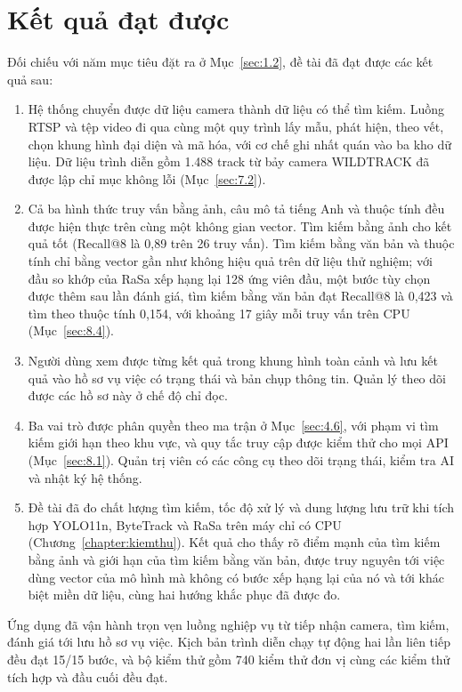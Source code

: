 \section{Kết quả đạt được}
\label{sec:9.1}

Đối chiếu với năm mục tiêu đặt ra ở Mục~\ref{sec:1.2}, đề tài đã đạt được các kết quả sau:
\begin{enumerate}
    \item Hệ thống chuyển được dữ liệu camera thành dữ liệu có thể tìm kiếm. Luồng RTSP và tệp video đi qua cùng một quy trình lấy mẫu, phát hiện, theo vết, chọn khung hình đại diện và mã hóa, với cơ chế ghi nhất quán vào ba kho dữ liệu. Dữ liệu trình diễn gồm 1.488 track từ bảy camera WILDTRACK đã được lập chỉ mục không lỗi (Mục~\ref{sec:7.2}).
    \item Cả ba hình thức truy vấn bằng ảnh, câu mô tả tiếng Anh và thuộc tính đều được hiện thực trên cùng một không gian vector. Tìm kiếm bằng ảnh cho kết quả tốt (Recall@8 là 0,89 trên 26 truy vấn). Tìm kiếm bằng văn bản và thuộc tính chỉ bằng vector gần như không hiệu quả trên dữ liệu thử nghiệm; với đầu so khớp của RaSa xếp hạng lại 128 ứng viên đầu, một bước tùy chọn được thêm sau lần đánh giá, tìm kiếm bằng văn bản đạt Recall@8 là 0,423 và tìm theo thuộc tính 0,154, với khoảng 17 giây mỗi truy vấn trên CPU (Mục~\ref{sec:8.4}).
    \item Người dùng xem được từng kết quả trong khung hình toàn cảnh và lưu kết quả vào hồ sơ vụ việc có trạng thái và bản chụp thông tin. Quản lý theo dõi được các hồ sơ này ở chế độ chỉ đọc.
    \item Ba vai trò được phân quyền theo ma trận ở Mục~\ref{sec:4.6}, với phạm vi tìm kiếm giới hạn theo khu vực, và quy tắc truy cập được kiểm thử cho mọi API (Mục~\ref{sec:8.1}). Quản trị viên có các công cụ theo dõi trạng thái, kiểm tra AI và nhật ký hệ thống.
    \item Đề tài đã đo chất lượng tìm kiếm, tốc độ xử lý và dung lượng lưu trữ khi tích hợp YOLO11n, ByteTrack và RaSa trên máy chỉ có CPU (Chương~\ref{chapter:kiemthu}). Kết quả cho thấy rõ điểm mạnh của tìm kiếm bằng ảnh và giới hạn của tìm kiếm bằng văn bản, được truy nguyên tới việc dùng vector của mô hình mà không có bước xếp hạng lại của nó và tới khác biệt miền dữ liệu, cùng hai hướng khắc phục đã được đo.
\end{enumerate}
Ứng dụng đã vận hành trọn vẹn luồng nghiệp vụ từ tiếp nhận camera, tìm kiếm, đánh giá tới lưu hồ sơ vụ việc. Kịch bản trình diễn chạy tự động hai lần liên tiếp đều đạt 15/15 bước, và bộ kiểm thử gồm 740 kiểm thử đơn vị cùng các kiểm thử tích hợp và đầu cuối đều đạt.
